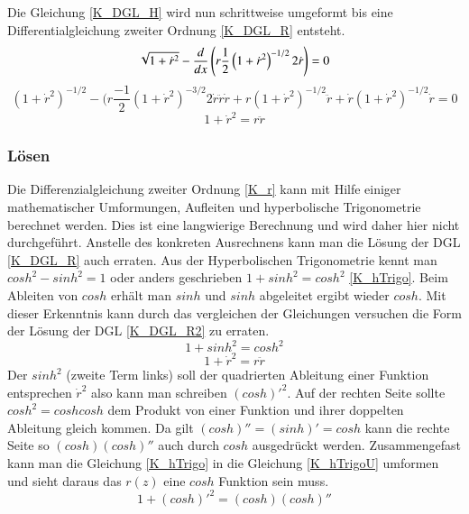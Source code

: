 \begin{refsection}
Die Gleichung \eqref{K_DGL_H} wird nun schrittweise umgeformt bis eine  Differentialgleichung zweiter Ordnung \eqref{K_DGL_R} entsteht.
\begin{equation} \label{K_DGL_H}
\sqrt{1+{\dot {r}}^2}-\frac{ d }{ dx } \left( r \frac{ 1 }{2  }\left( {1+{\dot {r}}^2}  \right)^{-1/2} 2 \dot {r}\right)=0
\\
\end{equation}
\begin{equation} \label{K_DGL_H2}
\left(1+{\dot {r}}^2  \right)^{-1/2}-(r \frac{ -1 }{2  } \left({1+{\dot {r}}^2}  \right)^{-3/2} 2 \dot{r} \ddot{r}  \dot{r}+ r \left({1+{\dot {r}}^2}  \right)^{-1/2} \ddot{r} +\dot{r} \left({1+{\dot {r}}^2}  \right)^{-1/2} \dot{r}=0
\end{equation}
\begin{equation} \label{K_DGL_R}
1+{\dot {r}}^2=r  \ddot{r}
\end{equation}
\subsubsection{Lösen}
Die Differenzialgleichung zweiter Ordnung \eqref{K_r} kann mit Hilfe einiger mathematischer Umformungen, Aufleiten und hyperbolische Trigonometrie berechnet werden. 
Dies ist eine langwierige Berechnung und wird daher hier nicht durchgeführt.
Anstelle des konkreten Ausrechnens kann man die Lösung der DGL \eqref{K_DGL_R} auch erraten. 
Aus der Hyperbolischen Trigonometrie kennt man $cosh^2-sinh^2=1$ oder anders geschrieben $1+sinh^2=cosh^2$ \eqref{K_hTrigo}. Beim Ableiten von $cosh$ erhält man $sinh$ und $sinh$ abgeleitet ergibt wieder $cosh$. Mit dieser Erkenntnis kann durch das vergleichen der Gleichungen versuchen die Form der Lösung der DGL \eqref{K_DGL_R2} zu erraten. 
\begin{equation} \label{K_hTrigo}
1+sinh^2=cosh^2
\end{equation}
\begin{equation} \label{K_DGL_R2}
1+{\dot {r}}^2=r  \ddot{r}
\end{equation}
Der $sinh^2$  (zweite Term links) soll der quadrierten Ableitung einer Funktion entsprechen ${\dot {r}}^2$ also kann man schreiben $(cosh)'^2$. Auf der rechten Seite sollte $cosh^2=cosh cosh$ dem Produkt von einer Funktion und ihrer doppelten Ableitung gleich kommen. Da gilt $(cosh)''=(sinh)'=cosh$ kann die rechte Seite so $(cosh) (cosh)''$ auch durch $cosh$ ausgedrückt werden. Zusammengefast kann man die Gleichung \eqref{K_hTrigo} in die Gleichung \eqref{K_hTrigoU} umformen und sieht daraus das $r(z)$ eine $cosh$ Funktion sein muss.
\begin{equation} \label{K_hTrigoU}
1+(cosh)'^2=(cosh) (cosh)''
\end{equation}


\end{refsection}
